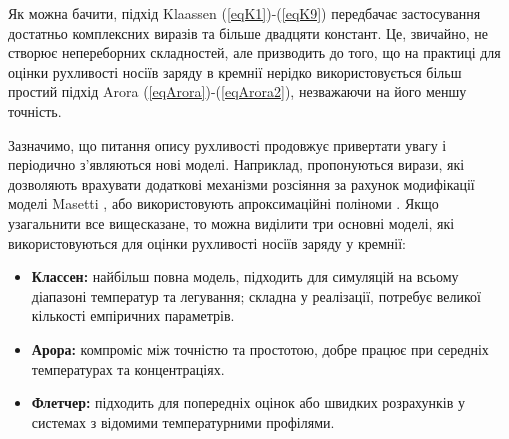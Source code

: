 \documentclass[14pt,a4paper,titlepage,oneside]{book}
\numberwithin{equation}{part}
\begin{document}
Як можна бачити, підхід Klaassen (\ref{eqK1})-(\ref{eqK9}) передбачає застосування достатньо комплексних виразів та більше двадцяти констант.
Це, звичайно, не створює непереборних складностей, але призводить до того, що на практиці для оцінки рухливості носіїв заряду в кремнії нерідко використовується більш простий
підхід Arora (\ref{eqArora})-(\ref{eqArora2}), незважаючи на його меншу точність.

Зазначимо, що питання опису рухливості продовжує привертати увагу і періодично з'являються нові моделі.
Наприклад, пропонуються вирази, які дозволяють врахувати додаткові механізми розсіяння за рахунок модифікації моделі Masetti \cite{Cummings2010},
або використовують апроксимаційні поліноми \cite{NoorMohammad1993}.
Якщо узагальнити все вищесказане, то можна виділити три основні моделі, які використовуються для оцінки рухливості носіїв заряду у кремнії:

\begin{itemize}
  \item \textbf{Классен:} найбільш повна модель, підходить для симуляцій на всьому діапазоні температур та легування; складна у реалізації, потребує великої кількості емпіричних параметрів.
  \item \textbf{Арора:} компроміс між точністю та простотою, добре працює при середніх температурах та концентраціях.
  \item \textbf{Флетчер:} підходить для попередніх оцінок або швидких розрахунків у системах з відомими температурними профілями.
\end{itemize}
\end{document}
